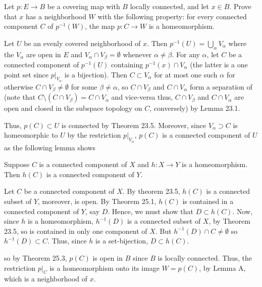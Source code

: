 \begin{problem}
  Let \(p\colon E\to B\) be a covering map with \(B\) locally connected,
  and let \(x\in B\). Prove that \(x\) has a neighborhood \(W\) with the
  following property: for every connected component \(C\) of \(p^{-1}(W)\),
  the map \(p\colon C\to W\) is a homeomorphism.
\end{problem}
\begin{solution}
  Let \(U\) be an evenly covered neighborhood of \(x\). Then
  \(p^{-1}(U)=\bigcup_\alpha V_\alpha\) where the \(V_\alpha\) are open in
  \(E\) and \(V_\alpha\cap V_\beta=\emptyset\) whenever
  \(\alpha\neq\beta\). For any \(\alpha\), let \(C\) be a connected
  component of \(p^{-1}(U)\) containing \(p^{-1}(x)\cap V_\alpha\) (the
  latter is a one point set since \(\left.p\right|_{V_\alpha}\) is a
  bijection). Then \(C\subset V_\alpha\) for at most one such \(\alpha\)
  for otherwise \(C\cap V_\beta\neq\emptyset\) for some
  \(\beta\neq\alpha\), so \(C\cap V_\beta\) and \(C\cap V_\alpha\) form a
  separation of (note that \(C\setminus(C\cap V_\beta)=C\cap V_\alpha\) and
  vice-versa thus, \(C\cap V_\beta\) and \(C\cap V_\alpha\) are open and
  closed in the subspace topology on \(C\), conversely) by Lemma 23.1.

  Thus, \(p(C)\subset U\) is connected by Theorem 23.5. Moreover, since
  \(V_\alpha\supset C\) is homeomorphic to \(U\) by the restriction
  \(\left.p\right|_{V_\alpha}\), \(p(C)\) is a connected component of \(U\)
  as the following lemma shows
  \begin{lemma*}
    Suppose \(C\) is a connected component of \(X\) and \(h\colon X\to Y\)
    is a homeomorphism. Then \(h(C)\) is a connected component of \(Y\).
  \end{lemma*}
  \begin{subproof}
    Let \(C\) be a connected component of \(X\). By theorem 23.5, \(h(C)\)
    is a connected subset of \(Y\), moreover, is open. By Theorem 25.1,
    \(h(C)\) is contained in a connected component of \(Y\), say
    \(D\). Hence, we must show that \(D\subset h(C)\). Now, since \(h\)
    is a homeomorphism, \(h^{-1}(D)\) is a connected subset of \(X\), by
    Theorem 23.5, so is contained in only one component of \(X\). But
    \(h^{-1}(D)\cap C\neq\emptyset\) so \(h^{-1}(D)\subset C\). Thus,
    since \(h\) is a set-bijection, \(D\subset h(C)\).
  \end{subproof}
  so by Theorem 25.3, \(p(C)\) is open in \(B\) since \(B\) is locally
  connected. Thus, the restriction \(\left.p\right|_{C}\) is a
  homeomorphism onto its image \(W= p(C)\), by Lemma A, which is a
  neighborhood of \(x\).
\end{solution}

